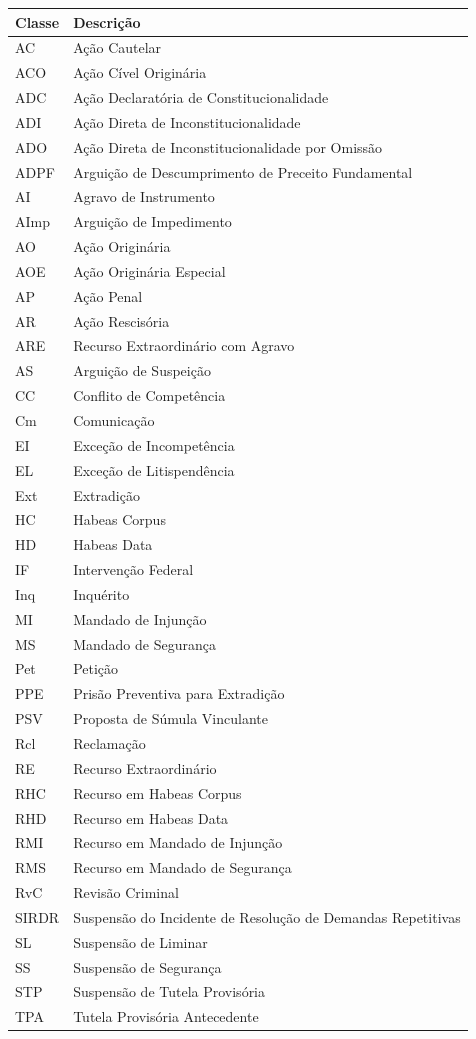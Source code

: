 \documentclass[
]{book}
\begin{document}
\begin{tabular}{l|l}
\hline
Classe & Descrição\\
\hline
AC & Ação Cautelar\\
\hline
ACO & Ação Cível Originária\\
\hline
ADC & Ação Declaratória de Constitucionalidade\\
\hline
ADI & Ação Direta de Inconstitucionalidade\\
\hline
ADO & Ação Direta de Inconstitucionalidade por Omissão\\
\hline
ADPF & Arguição de Descumprimento de Preceito Fundamental\\
\hline
AI & Agravo de Instrumento\\
\hline
AImp & Arguição de Impedimento\\
\hline
AO & Ação Originária\\
\hline
AOE & Ação Originária Especial\\
\hline
AP & Ação Penal\\
\hline
AR & Ação Rescisória\\
\hline
ARE & Recurso Extraordinário com Agravo\\
\hline
AS & Arguição de Suspeição\\
\hline
CC & Conflito de Competência\\
\hline
Cm & Comunicação\\
\hline
EI & Exceção de Incompetência\\
\hline
EL & Exceção de Litispendência\\
\hline
Ext & Extradição\\
\hline
HC & Habeas Corpus\\
\hline
HD & Habeas Data\\
\hline
IF & Intervenção Federal\\
\hline
Inq & Inquérito\\
\hline
MI & Mandado de Injunção\\
\hline
MS & Mandado de Segurança\\
\hline
Pet & Petição\\
\hline
PPE & Prisão Preventiva para Extradição\\
\hline
PSV & Proposta de Súmula Vinculante\\
\hline
Rcl & Reclamação\\
\hline
RE & Recurso Extraordinário\\
\hline
RHC & Recurso em Habeas Corpus\\
\hline
RHD & Recurso em Habeas Data\\
\hline
RMI & Recurso em Mandado de Injunção\\
\hline
RMS & Recurso em Mandado de Segurança\\
\hline
RvC & Revisão Criminal\\
\hline
SIRDR & Suspensão do Incidente de Resolução de Demandas Repetitivas\\
\hline
SL & Suspensão de Liminar\\
\hline
SS & Suspensão de Segurança\\
\hline
STP & Suspensão de Tutela Provisória\\
\hline
TPA & Tutela Provisória Antecedente\\
\hline
\end{tabular}
\end{document}
